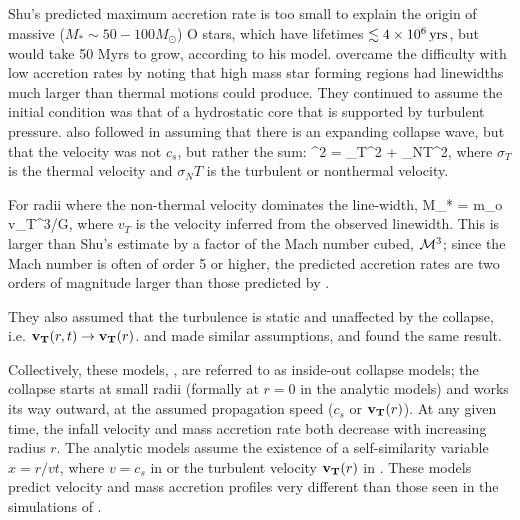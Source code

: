 \documentclass[../dissertation.tex]{subfiles}
\begin{document}
\subsection{\citet{1992ApJ...396..631M}}%
Shu's predicted maximum  accretion rate is too small to explain the origin of massive ($M_*\sim50-100M_\odot$) O stars, which have lifetimes $\lesssim 4\times10^6\,\rm yrs$, but would take 50 Myrs to grow, according to his model.
\citet{1992ApJ...396..631M}  overcame the difficulty with low accretion rates by noting that high mass star forming regions had linewidths much larger than thermal motions could produce. 
They continued to assume the initial condition was that of a hydrostatic core that is supported by turbulent pressure. 
\citet{1992ApJ...396..631M} also followed \citet{1977ApJ...214..488S} in assuming that there is an expanding collapse wave, but that the velocity was not $c_s$, but rather the sum: 
%
\be
\sigma^2 = \sigma_T^2 + \sigma_{NT}^2, 
\ee
%
where $\sigma_T$ is the thermal velocity and $\sigma_NT$ is the turbulent or nonthermal velocity. 

For radii where the non-thermal velocity dominates the line-width, 
%
\be
\dot M_* = m_o v_T^3/G,
\ee
%
where $v_T$ is the velocity inferred from the observed linewidth. 
This is larger than Shu's estimate by a factor of the Mach number cubed, ${\cal M}^3$; since the Mach number is often of order 5 or higher, the predicted accretion rates are two orders of magnitude larger than those predicted by \citet{1977ApJ...214..488S}.

They also assumed that the turbulence is static and unaffected by the collapse, i.e. $\mathbf{v_T} (r,t) \rightarrow \mathbf{v_T} (r)$.  
\citet{1997ApJ...476..750M} and \citet{2003ApJ...585..850M} made similar assumptions, and found the same result.  

Collectively, these models, \citep{1977ApJ...214..488S,1992ApJ...396..631M,1997ApJ...476..750M,2003ApJ...585..850M}, 
are referred to as inside-out collapse models; the collapse starts at small radii (formally at $r=0$ in the analytic models) 
and works its way outward, at the assumed propagation speed ($c_s$ or $\mathbf{v_T} (r)$). 
At any given time, the infall velocity and mass accretion rate both decrease with increasing radius $r$. 
The analytic models assume the existence of a self-similarity variable $x = r/vt$, where $v=c_s$ in 
\citet{1977ApJ...214..488S} or the turbulent velocity $\mathbf{v_T} (r)$ in \citet{1992ApJ...396..631M,1997ApJ...476..750M,2003ApJ...585..850M}.  
These models predict velocity and mass accretion profiles very different than those seen 
in the simulations of \citet{2015ApJ...800...49L}.
\end{document}
